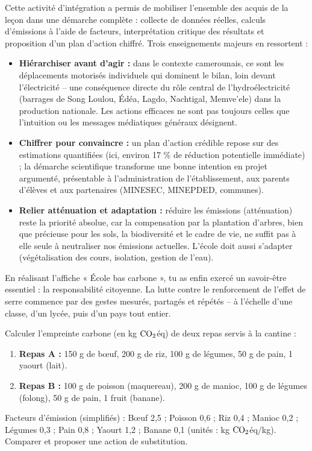 \documentclass[11pt]{article}
\newcounter{popsec}
\newcounter{popsub}
\newcommand{\courssub}[1]{%
  \stepcounter{popsub}%
  \par\vspace{9pt}\noindent{\popxbold\fontsize{11.5}{13}\selectfont\color{popink}{\color{poporange}\thepopsec.\thepopsub}\hspace{6pt}#1}\par\nopagebreak\vspace{4pt}
}
\begin{document}
\courssub{Bilan de l'activité}

Cette activité d'intégration a permis de mobiliser l'ensemble des acquis de la leçon dans une démarche complète : collecte de données réelles, calculs d'émissions à l'aide de facteurs, interprétation critique des résultats et proposition d'un plan d'action chiffré. Trois enseignements majeurs en ressortent :

\begin{itemize}
\item \textbf{Hiérarchiser avant d'agir :} dans le contexte camerounais, ce sont les déplacements motorisés individuels qui dominent le bilan, loin devant l'électricité -- une conséquence directe du rôle central de l'hydroélectricité (barrages de Song Loulou, Édéa, Lagdo, Nachtigal, Memve'ele) dans la production nationale. Les actions efficaces ne sont pas toujours celles que l'intuition ou les messages médiatiques généraux désignent.
\item \textbf{Chiffrer pour convaincre :} un plan d'action crédible repose sur des estimations quantifiées (ici, environ 17 \% de réduction potentielle immédiate) ; la démarche scientifique transforme une bonne intention en projet argumenté, présentable à l'administration de l'établissement, aux parents d'élèves et aux partenaires (MINESEC, MINEPDED, communes).
\item \textbf{Relier atténuation et adaptation :} réduire les émissions (atténuation) reste la priorité absolue, car la compensation par la plantation d'arbres, bien que précieuse pour les sols, la biodiversité et le cadre de vie, ne suffit pas à elle seule à neutraliser nos émissions actuelles. L'école doit aussi s'adapter (végétalisation des cours, isolation, gestion de l'eau).
\end{itemize}

En réalisant l'affiche « École bas carbone », tu as enfin exercé un savoir-être essentiel : la responsabilité citoyenne. La lutte contre le renforcement de l'effet de serre commence par des gestes mesurés, partagés et répétés -- à l'échelle d'une classe, d'un lycée, puis d'un pays tout entier.

\begin{exercice}
Calculer l'empreinte carbone (en kg $\ce{CO2}$éq) de deux repas servis à la cantine :
\begin{enumerate}
\item \textbf{Repas A :} 150 g de bœuf, 200 g de riz, 100 g de légumes, 50 g de pain, 1 yaourt (lait).
\item \textbf{Repas B :} 100 g de poisson (maquereau), 200 g de manioc, 100 g de légumes (folong), 50 g de pain, 1 fruit (banane).
\end{enumerate}
Facteurs d'émission (simplifiés) : Bœuf 2,5 ; Poisson 0,6 ; Riz 0,4 ; Manioc 0,2 ; Légumes 0,3 ; Pain 0,8 ; Yaourt 1,2 ; Banane 0,1 (unités : kg $\ce{CO2}$éq/kg). Comparer et proposer une action de substitution.
\end{exercice}
\end{document}
